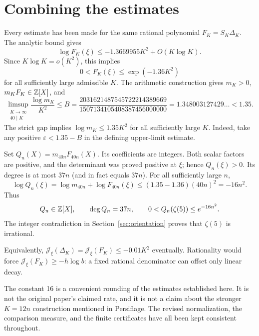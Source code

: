 \section{Combining the estimates}\label{sec:conclusion}

Every estimate has been made for the same rational polynomial
\(F_K=S_K\Delta_K\). The analytic bound gives
\[
 \log F_K(\xi)\leq -1.3669955K^2+O(K\log K).
\]
Since \(K\log K=o(K^2)\), this implies
\[
 0<F_K(\xi)\leq \exp(-1.36K^2)
\]
for all sufficiently large admissible \(K\).
The arithmetic construction gives \(m_K>0\), \(m_KF_K\in\mathbb Z[X]\),
and
\[
 \limsup_{\substack{K\to\infty\\40\mid K}}
       \frac{\log m_K}{K^2}
 \leq
 B=
 \frac{2031621487545722214389669}{1507134105408387456000000}
 =1.348003127429\ldots<1.35.
\]
The strict gap implies \(\log m_K\leq1.35K^2\) for all sufficiently
large \(K\). Indeed, take any positive
\(\varepsilon<1.35-B\) in the defining upper-limit estimate.

Set \(Q_n(X)=m_{40n}F_{40n}(X)\). Its coefficients are integers.
Both scalar factors are positive, and the determinant was proved positive
at \(\xi\); hence \(Q_n(\xi)>0\). Its degree is at most \(37n\)
(and in fact equals \(37n\)).
For all sufficiently large \(n\),
\[
 \log Q_n(\xi)
 =\log m_{40n}+\log F_{40n}(\xi)
 \leq (1.35-1.36)(40n)^2=-16n^2.
\]
Thus
\[
 Q_n\in\mathbb Z[X],\qquad
 \deg Q_n=37n,\qquad
 0<Q_n(\zeta(5))\leq e^{-16n^2}.
\]
The integer contradiction in Section~\ref{sec:orientation} proves
that \(\zeta(5)\) is irrational.

Equivalently, \(\mathcal J_\xi(\Delta_K)=\mathcal J_\xi(F_K)\le-0.01K^2\)
eventually. Rationality would force \(\mathcal J_\xi(F_K)\ge-h\log b\):
a fixed rational denominator can offset only linear decay.

The constant 16 is a convenient rounding of the estimates established
here. It is not the original paper's claimed rate, and it is not a claim
about the stronger \(K=12n\) construction mentioned in Persiflage.
The revised normalization, the comparison measure, and the finite
certificates have all been kept consistent throughout.
